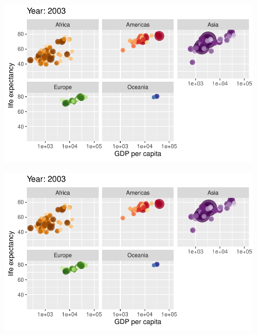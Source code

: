 \documentclass[
  letterpaper,
  DIV=11,
  numbers=noendperiod]{scrartcl}
\begin{document}
\begin{figure}[H]

{\centering \includegraphics{class05_files/figure-pdf/unnamed-chunk-24-92.pdf}

}

\end{figure}

\begin{figure}[H]

{\centering \includegraphics{class05_files/figure-pdf/unnamed-chunk-24-93.pdf}

}

\end{figure}
\end{document}
